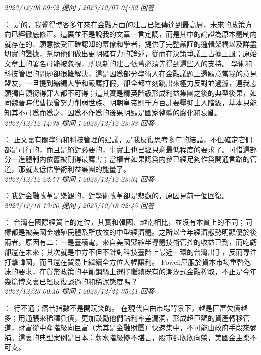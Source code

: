 \documentclass[twocolumn]{ctexart}
\begin{document}
\textit{\hfill\noindent\small 2023/12/06 09:52 提问；2023/12/07 04:52 回答}

：
是的，我覺得博客多年來在金融方面的建言已經傳達到最高層，未來的政策方向已經徹底修正。這裏並不是說我的文章一言定調，而是其中的論證為原本體制内就存在的、願意接受正確認知的幕僚和學者，提供了完整嚴謹的邏輯架構以及詳盡切實的證據，幫助他們做出更明確有力的論述，從而在決策爭議上占據上風；原始文章上的署名可能被忽視，所以新的建言依舊必須先得到這些人的支持。
學術和科技管理的問題卻很難解決，這是因爲部分學術人在金融議題上還願意當我的意見盟友，一旦提到縮編大學和嚴厲打假，卻全都立刻跳出來極力反對並過濾，連我志願獨自領銜得罪人都不可得；這其實是精英階級形成利益集團之後的典型後果，如同魏晉時代曹操曾努力削弱世族、明朝皇帝則千方百計要壓抑士人階級，基本只能知其不可爲而爲之，因爲不作爲的後果明顯是國家整體的腐化和衰亂。
\\

\textit{\hfill\noindent\small 2023/12/12 14:38 提问；2023/12/12 23:33 回答}

：
正文裏有關學術和科技管理的建議，是我反復思考多年的結晶，不但確定它們都是可行的，而且是絕對必要的，事實上也已經只剩最低程度的要求了。可惜這部分一進體制内依舊被刪得最厲害；當權者如果認爲内參已經足夠作爲開通言路的管道，那就太低估學術利益集團的能量了。
\\

\textit{\hfill\noindent\small 2023/12/12 22:57 提问；2023/12/12 23:34 回答}

：我對金融改革是樂觀的，對學術改革卻是悲觀的，原因見前一個回復。
\\

\textit{\hfill\noindent\small 2023/12/16 13:20 提问；2023/12/18 02:45 回答}

：
台灣在國際經貿上的定位，其實和韓國、越南相比，並沒有本質上的不同；同樣都是被美國金融殖民體系所放牧的中型經濟體。之所以今年經濟態勢明顯優於後兩者，原因有二：一是臺積電，來自美國緊縮半導體技術管控的收益已到，而吃虧卻還在未來；其次就是中方不但不針對科技臺階上最近一環的台灣出手，反而專注打擊韓國，而且還在貿易上繼續全方位大幅讓利。
Powell屈服於資本市場重啓泡沫的要求，在貨幣政策的平衡鋼絲上選擇繼續既有的潮汐式金融榨取，不正是今年幾篇博文裏已經反復談過的和稀泥態度嗎？
\\

\textit{\hfill\noindent\small 2023/12/23 00:46 提问；2023/12/24 05:41 回答}

：
行不通；痛苦指數不是開玩笑的。
在現代自由市場背景下，越是巨富欠債越多；用通脹來稀釋負債，更加鼓勵他們鉆利率差漏洞，形成超巨額的資產轉移管道，財富從中產階級向巨富（尤其是金融財團）快速集中，不可能由政府手段來彌補。這裏的典型案例是日本：薪水階級慘不堪言，股市卻欣欣向榮，美國金主樂不可支。
\\


 
\end{document}
